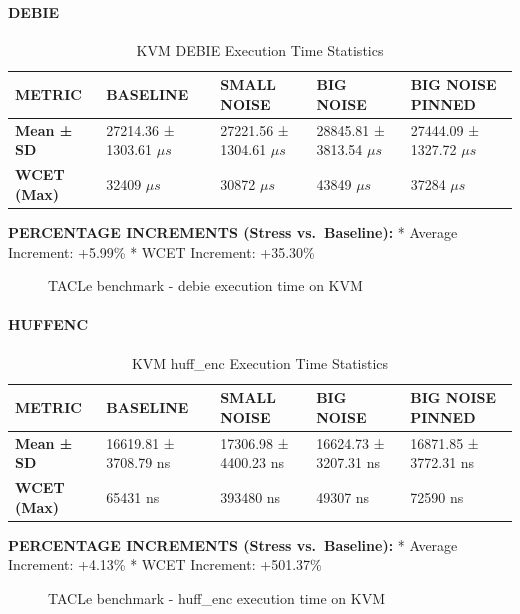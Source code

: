 \paragraph{DEBIE}\label{debie}

\begin{table}
\centering
\caption{KVM DEBIE Execution Time Statistics}
\label{tab:kvm:debie}
\begin{tabularx}{\linewidth}{@{}YYYYY@{}}
\toprule
METRIC & BASELINE & SMALL NOISE & BIG NOISE & BIG NOISE PINNED\tabularnewline
\midrule
\textbf{Mean ± SD} & 27214.36 ± 1303.61 $\mu s$ & 27221.56 ± 1304.61 $\mu s$ & 28845.81 ± 3813.54 $\mu s$ & 27444.09 ± 1327.72 $\mu s$\tabularnewline
\textbf{WCET (Max)} & 32409 $\mu s$ & 30872 $\mu s$ & 43849 $\mu s$ & 37284 $\mu s$\tabularnewline
\bottomrule
\end{tabularx}
\end{table}

\textbf{PERCENTAGE INCREMENTS (Stress vs.~Baseline):} * Average
Increment: +5.99\% * WCET Increment: +35.30\%

\begin{figure}
\centering

\caption{TACLe benchmark - debie execution time on KVM}
\end{figure}

\paragraph{HUFFENC}\label{huffenc}

\begin{table}
\centering
\caption{KVM huff\_enc Execution Time Statistics}
\label{tab:kvm:huffenc}
\begin{tabularx}{\linewidth}{@{}YYYYY@{}}
\toprule
METRIC & BASELINE & SMALL NOISE & BIG NOISE & BIG NOISE PINNED\tabularnewline
\midrule
\textbf{Mean ± SD} & 16619.81 ± 3708.79 ns & 17306.98 ± 4400.23 ns & 16624.73 ± 3207.31 ns & 16871.85 ± 3772.31 ns\tabularnewline
\textbf{WCET (Max)} & 65431 ns & 393480 ns & 49307 ns & 72590 ns\tabularnewline
\bottomrule
\end{tabularx}
\end{table}

\textbf{PERCENTAGE INCREMENTS (Stress vs.~Baseline):} * Average
Increment: +4.13\% * WCET Increment: +501.37\%

\begin{figure}
\centering

\caption{TACLe benchmark - huff\_enc execution time on KVM}
\end{figure}

